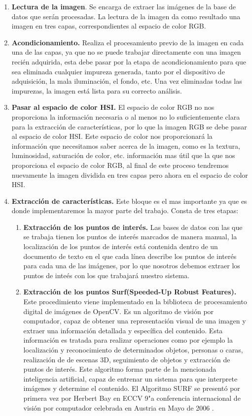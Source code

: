 \begin{enumerate}
	\item \textbf{Lectura de la imagen}. Se encarga de extraer las im\'agenes de la base de datos que ser\'an procesadas. La lectura de la imagen da como resultado una imagen en tres capas, correspondientes al espacio de color RGB.
	\item \textbf{Acondicionamiento.} Realiza el procesamiento previo de la imagen en cada una de las capas, ya que no se puede trabajar directamente con una imagen reci\'en adquirida, esta debe pasar por la etapa de acondicionamiento para que sea eliminada cualquier impureza generada, tanto por el dispositivo de adquisici\'on, la mala iluminaci\'on, el fondo, etc. Una vez eliminadas todas las impurezas, la imagen est\'a lista para su correcto an\'alisis.
	\item \textbf{Pasar al espacio de color HSI.} El espacio de color RGB no nos proporciona la informaci\'on necesaria o al menos no lo suficientemente clara para la extracci\'on de caracter\'isticas, por lo que la imagen RGB se debe pasar al espacio de color HSI. Este espacio de color nos proporcionar\'a la informaci\'on que necesitamos saber acerca de la imagen, como es la textura, luminosidad, saturaci\'on de color, etc. informaci\'on mas \'util que la que nos proporciona el espacio de color RGB, al final de este proceso tendremos nuevamente la imagen dividida en tres capas pero ahora en el espacio de color HSI.
	\item \textbf{Extracci\'on de caracter\'isticas.} Este bloque es el mas importante ya que es donde implementaremos la mayor parte del trabajo. Consta de tres etapas:
	\begin{enumerate}
		\item \textbf{Extracci\'on de los puntos de inter\'es.} Las bases de datos con las que se trabaja tienen los puntos de inter\'es marcados de manera manual, la localizaci\'on de los puntos de inter\'es est\'a contenida dentro de un documento de texto en el que cada l\'inea describe los puntos de inter\'es para cada una de las im\'agenes, por lo que nosotros debemos extraer los puntos de inte\'es con los que trabajar\'a nuestro sistema.
		\item \textbf{Extracci\'on de los puntos Surf(Speeded-Up Robust Features).} Este procedimiento viene implementado en la biblioteca de procesamiento digital de im\'agenes de OpenCV. Es un algoritmo de visi\'on por computador, capaz de obtener una representaci\'on visual de una imagen y extraer una informaci\'on detallada y espec\'ifica del contenido. Esta informaci\'on es tratada para realizar operaciones como por ejemplo la localizaci\'on y reconocimiento de determinados objetos, personas o caras, realizaci\'on de de escenas 3D, seguimiento de objetos y extracci\'on de puntos de inter\'es. Este algoritmo forma parte de la mencionada inteligencia artificial, capaz de entrenar un sistema para que interprete im\'agenes y determine el contenido. El Algoritmo SURF se present\'o por primera vez por Herbert Bay en ECCV 9"a conferencia internacional de visi\'on por computador celebrada en Austria en Mayo de 2006 \cite{bay2006surf}.

\end{enumerate}
\end{enumerate}
